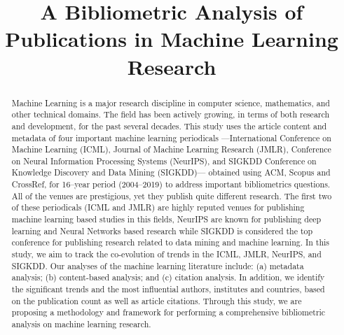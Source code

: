 \documentclass[10pt,sigconf,letterpaper,anonymous]{acmart}
\begin{document}
	


	\title{A Bibliometric Analysis of Publications in Machine Learning Research}



	\begin{abstract}
		Machine Learning is a major research discipline in computer science, mathematics, and other technical domains. The field has been actively growing, in terms of both research and development, for the past several decades. This study uses the article content and metadata of four important machine learning periodicals ---International Conference on Machine Learning (ICML), Journal of Machine Learning Research (JMLR), Conference on Neural Information Processing Systems (NeurIPS), and SIGKDD Conference on Knowledge Discovery and Data Mining (SIGKDD)--- obtained using ACM, Scopus and CrossRef, for 16--year period (2004--2019) to address important bibliometrics questions. All of the venues are prestigious, yet they publish quite different research. The first two of these periodicals (ICML and JMLR) are highly reputed venues for publishing machine learning based studies in this fields, NeurIPS are known for publishing deep learning and Neural Networks based research while SIGKDD is considered the top conference for publishing research related to data mining and machine learning. In this study, we aim to track the co-evolution of trends in the ICML, JMLR, NeurIPS, and SIGKDD. Our analyses of the machine learning literature include: (a) metadata analysis; (b) content-based analysis; and (c) citation analysis. In addition, we identify the significant trends and the most influential authors, institutes and countries, based on the publication count as well as article citations. Through this study, we are proposing a methodology and framework for performing a comprehensive bibliometric analysis on machine learning research.


	\end{abstract}

	\maketitle






	\balance
	
	
%	
\end{document}
